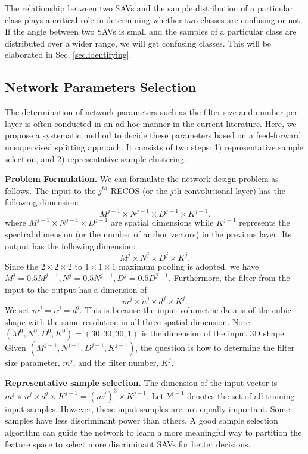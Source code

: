 \documentclass[preprint,12pt]{elsarticle}
\begin{document}
The relationship between two SAVs and the sample distribution of a
particular class plays a critical role in determining whether two
classes are confusing or not. If the angle between two SAVs is small and
the samples of a particular class are distributed over a wider range, we
will get confusing classes. This will be elaborated in Sec.
\ref{sec.identifying}. 

\subsection{Network Parameters Selection} \label{sec.design}

The determination of network parameters such as the filter size and
number per layer is often conducted in an ad hoc manner in the current
literature. Here, we propose a systematic method to decide these
parameters based on a feed-forward unsupervised splitting approach. It
consists of two steps: 1) representative sample selection, and 2)
representative sample clustering. 

{\bf Problem Formulation.} We can formulate the network design problem
as follows. The input to the $j^{th}$ RECOS (or the $j$th convolutional
layer) has the following dimension:
$$
M^{j-1} \times N^{j-1} \times D^{j-1} \times K^{j-1}.
$$ 
where $M^{j-1} \times N^{j-1} \times D^{j-1}$ are spatial dimensions
while $K^{j-1}$ represents the spectral dimension (or the number of
anchor vectors) in the previous layer. Its output has the following
dimension:
$$
M^{j} \times N^{j} \times D^{j} \times K^{j}.
$$ 
Since the $2 \times 2 \times 2$ to $1 \times 1 \times 1$ maximum pooling
is adopted, we have $M^{j}= 0.5 M^{j-1}, N^{j}= 0.5 N^{j-1}, D^{j}= 0.5
D^{j-1}.$ Furthermore, the filter from the input to the output has a
dimension of
$$
m^{j} \times n^{j} \times d^{j} \times K^{j}.
$$
We set $m^j = n^j = d^j.$ This is because the input volumetric data is
of the cubic shape with the same resolution in all three spatial
dimension. Note $(M^{0}, N^{0}, D^{0}, K^{0})=(30,30,30,1)$ is the
dimension of the input 3D shape.  Given $(M^{j-1}, N^{j-1}, D^{j-1},
K^{j-1})$, the question is how to determine the filter size parameter,
$m^{j}$, and the filter number, $K^{j}$. 

{\bf Representative sample selection.} The dimension of the input vector
is $m^j \times n^j \times d^j \times K^{j-1} = (m^j)^3 \times K^{j-1}$.
Let $Y^{j-1}$ denotes the set of all training input samples.  However,
these input samples are not equally important. Some samples have less
discriminant power than others.  A good sample selection algorithm can
guide the network to learn a more meaningful way to partition the
feature space to select more discriminant SAVs for better decisions.
\end{document}

